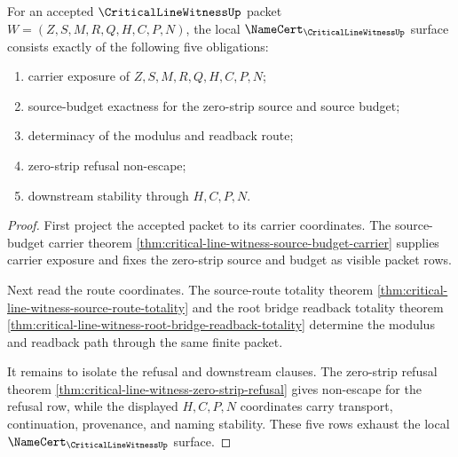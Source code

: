 \begin{theorem}
\label{thm:critical-line-witness-namecert-obligation-surface}
For an accepted $\CriticalLineWitnessUp$ packet $W=(Z,S,M,R,Q,H,C,P,N)$, the
local $\NameCert_{\CriticalLineWitnessUp}$ surface consists exactly of the
following five obligations:
\begin{enumerate}
\item carrier exposure of $Z,S,M,R,Q,H,C,P,N$;
\item source-budget exactness for the zero-strip source and source budget;
\item determinacy of the modulus and readback route;
\item zero-strip refusal non-escape;
\item downstream stability through $H,C,P,N$.
\end{enumerate}
\end{theorem}
\begin{proof}
First project the accepted packet to its carrier coordinates. The
source-budget carrier theorem
\autoref{thm:critical-line-witness-source-budget-carrier} supplies carrier
exposure and fixes the zero-strip source and budget as visible packet rows.

Next read the route coordinates. The source-route totality theorem
\autoref{thm:critical-line-witness-source-route-totality} and the root bridge
readback totality theorem
\autoref{thm:critical-line-witness-root-bridge-readback-totality} determine
the modulus and readback path through the same finite packet.

It remains to isolate the refusal and downstream clauses. The zero-strip
refusal theorem
\autoref{thm:critical-line-witness-zero-strip-refusal} gives non-escape for
the refusal row, while the displayed $H,C,P,N$ coordinates carry transport,
continuation, provenance, and naming stability. These five rows exhaust the
local $\NameCert_{\CriticalLineWitnessUp}$ surface.
\end{proof}

